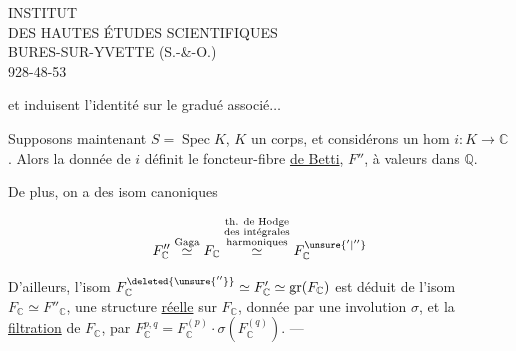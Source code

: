 
INSTITUT\\
DES HAUTES ÉTUDES SCIENTIFIQUES\\
BURES-SUR-YVETTE (S.-\&-O.)\\
928-48-53

et induisent l'identité sur le gradué associé$\ldots$

Supposons maintenant $S=\operatorname{Spec} K$, $K$ un corps, et considérons un hom $i:K\longrightarrow\mathbb C$. Alors la donnée de $i$ définit le foncteur-fibre \uline{de Betti},  $F''$, à valeurs dans $\mathbb Q$.

De plus, on a des isom canoniques

\[
F''_{\mathbb C}\overset{\text{Gaga}}{\simeq} F_{\mathbb C}
\overset{\substack{\text{th. de Hodge}\\\text{des intégrales}\\\text{harmoniques}}}{\simeq}
F_{\mathbb C}^{\unsure{'|''}}
\]

D'ailleurs, l'isom $F_{\mathbb C}^{\deleted{\unsure{''}}}\simeq F'_{\mathbb C}\simeq\operatorname{gr}(F_{\mathbb C})$ est déduit de l'isom $F_{\mathbb C}\simeq F''_{\mathbb C}$,  une structure \uline{réelle} sur $F_{\mathbb C}$, donnée par une involution $\sigma$, et la \uline{filtration}  de $F_{\mathbb C}$, par $F^{p,q}_{\mathbb C}=F^{(p)}_{\mathbb C}\cdot\sigma(F^{(q)}_{\mathbb C})$. ---
